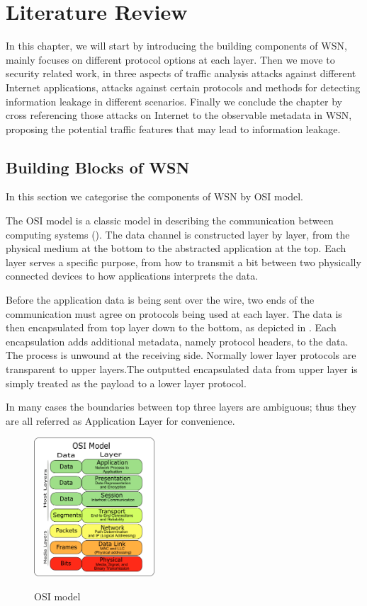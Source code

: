 \chapter{Literature Review} \label{Chp: LiteratureReview}

In this chapter, we will start by introducing the building components of WSN, mainly focuses on different protocol options at each layer. Then we move to security related work, in three aspects of traffic analysis attacks against different Internet applications, attacks against certain protocols and methods for detecting information leakage in different scenarios. Finally we conclude the chapter by cross referencing those  attacks on Internet to the observable metadata in WSN, proposing the potential traffic features that may lead to information leakage.

\section{Building Blocks of WSN}
In this section we categorise the components of WSN by OSI model\cite{OSI}.

The OSI model is a classic model in describing the communication between computing systems (). The data channel is constructed layer by layer, from the physical medium at the bottom to the abstracted application at the top. Each layer serves a specific purpose, from how to transmit a bit between two physically connected devices to how applications interprets the data.



Before the application data is being sent over the wire, two ends of the communication must agree on protocols being used at each layer. The data is then encapsulated from top layer down to the bottom, as depicted in . Each encapsulation adds additional metadata, namely protocol headers, to the data. The process is unwound at the receiving side. Normally lower layer protocols are transparent to upper layers.The outputted encapsulated data from upper layer is simply treated as the payload to a lower layer protocol.

In many cases the boundaries between top three layers are ambiguous; thus they are all referred as Application Layer for convenience.

\begin{figure}
\centering
{
	\includegraphics[width=0.4\textwidth,]{fig/Osi-model-jb.png}
}
\caption{OSI model} \label{fig: OSI model}
\end{figure}

